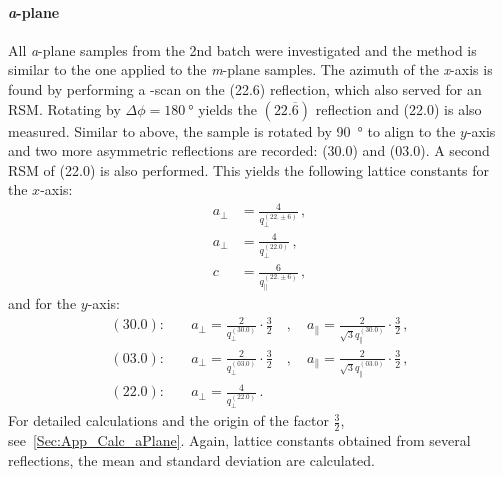 \paragraph{\textit{a}-plane}
    All \textit{a}-plane samples from the 2nd batch were investigated and the method is similar to the one applied to the \textit{m}-plane samples.
    The azimuth of the \textit{x}-axis is found by performing a \textphi-scan on the (22.6) reflection, which also served for an \gls{RSM}.
    Rotating by $\Delta\phi=\qty{180}{\degree}$ yields the $(22.\overline{6})$ reflection and (22.0) is also measured.
    Similar to above, the sample is rotated by \qty{90}{\degree} to align to the $y$-axis and two more asymmetric reflections are recorded: (30.0) and (03.0).
    A second \gls{RSM} of (22.0) is also performed.
    This yields the following lattice constants for the $x$-axis:
    \begin{align}
        a_\perp &= \frac{4}{q_\perp^{(22.\pm6)}} \,,\\
        a_\perp &= \frac{4}{q_\perp^{(22.0)}}\,,\\
        c &= \frac{6}{q_\parallel^{(22.\pm6)}} \,,
    \end{align}
    and for the $y$-axis:
    \begin{align}
        (30.0):&\quad
            a_\perp = \frac{2}{q_\perp^{(30.0)}}\cdot\frac{3}{2}
            \quad,\quad
            a_\parallel = \frac{2}{\sqrt{3}q_\parallel^{(30.0)}}\cdot\frac{3}{2}\,,\\
        (03.0):&\quad
            a_\perp = \frac{2}{q_\perp^{(03.0)}}\cdot\frac{3}{2}
            \quad,\quad
            a_\parallel = \frac{2}{\sqrt{3}q_\parallel^{(03.0)}}\cdot\frac{3}{2}\,,\\
        (22.0):&\quad
            a_\perp = \frac{4}{q_\perp^{(22.0)}}\,.
    \end{align}
    For detailed calculations and the origin of the factor $\frac{3}{2}$, see\ \ref{Sec:App_Calc_aPlane}.
    Again, lattice constants obtained from several reflections, the mean and standard deviation are calculated.
